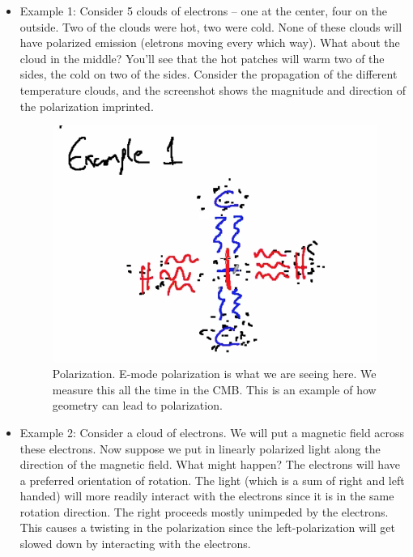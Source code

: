 \documentclass{article}
\begin{document}
\begin{itemize}
    \item Example 1: Consider 5 clouds of electrons -- one at the center, four on the outside. Two of the clouds were hot, two were cold. None of these clouds will have polarized emission (eletrons moving every which way). What about the cloud in the middle? You'll see that the hot patches will warm two of the sides, the cold on two of the sides. Consider the propagation of the different temperature clouds, and the screenshot shows the magnitude and direction of the polarization imprinted. 
    \begin{figure}
        \centering
        \includegraphics{figures/Screen Shot 2020-10-27 at 11.52.03 AM.png}
        \caption{Polarization. E-mode polarization is what we are seeing here. We measure this all the time in the CMB. This is an example of how geometry can lead to polarization. }
        \label{fig:CMBpolarization}
    \end{figure}
    \item Example 2: Consider a cloud of electrons. We will put a magnetic field across these electrons. Now suppose we put in linearly polarized light along the direction of the magnetic field. What might happen? The electrons will have a preferred orientation of rotation. The light (which is a sum of right and left handed) will more readily interact with the electrons since it is in the same rotation direction. The right proceeds mostly unimpeded by the electrons. This causes a twisting in the polarization since the left-polarization will get slowed down by interacting with the electrons. 
\end{itemize}
\end{document}
